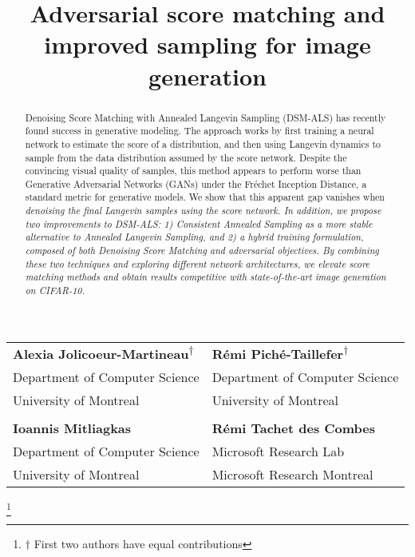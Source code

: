 \documentclass{article} \usepackage{iclr2021_conference_notitle,times}
\title{Adversarial score matching and improved sampling for image generation}
\theoremstyle{definition}
\theoremstyle{definition}
\begin{document}
\maketitle
\renewcommand{\thefootnote}{\fnsymbol{footnote}}



\vspace{-1cm}
\hspace{-1cm}
\setlength{\tabcolsep}{30pt}
\begin{tabular}{ll}
\textbf{Alexia Jolicoeur-Martineau}\textsuperscript{$\dagger$} & \textbf{Rémi Piché-Taillefer}\textsuperscript{$\dagger$} \\
    \normalfont Department of Computer Science & \normalfont Department of Computer Science \\
    \normalfont University of Montreal & \normalfont University of Montreal \\  \vspace{5pt} \\
    \textbf{Ioannis Mitliagkas} & \textbf{Rémi Tachet des Combes} \\ \normalfont Department of Computer Science & \normalfont Microsoft Research Lab \\
    \normalfont University of Montreal & \normalfont Microsoft Research Montreal
\end{tabular}
\vspace{1cm}
\setlength{\tabcolsep}{6pt}
\footnote[0]{$\dagger$ First two authors have equal contributions}
 
\begin{abstract}
Denoising Score Matching with Annealed Langevin Sampling (DSM-ALS) has recently found success in generative modeling. The approach works by first training a neural network to estimate the score of a distribution, and then using Langevin dynamics to sample from the data distribution assumed by the score network. Despite the convincing visual quality of samples, this method appears to perform worse than Generative Adversarial Networks (GANs) under the Fréchet Inception Distance, a standard metric for generative models. We show that this apparent gap vanishes when \em denoising \em the final Langevin samples using the score network.
In addition, we propose two improvements to DSM-ALS:  1) Consistent Annealed Sampling as a more stable alternative to Annealed Langevin Sampling, and 2) a hybrid training formulation, composed of both Denoising Score Matching and adversarial objectives. By combining these two techniques and exploring different network architectures, we elevate score matching methods and obtain results competitive with state-of-the-art image generation on CIFAR-10.

  
\end{abstract}
\end{document}
